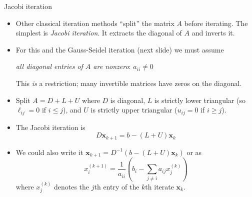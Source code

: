 \documentclass[10pt,hyperref]{beamer}
\newcommand{\bx}{\mathbf{x}}
\begin{document}
\begin{frame}{Jacobi iteration}

\begin{itemize}
\item Other classical iteration methods ``split'' the matrix $A$ before iterating.  The simplest is \emph{Jacobi iteration}.  It extracts the diagonal of $A$ and inverts it.
\item For this and the Gauss-Seidel iteration (next slide) we must assume

\centerline{\emph{all diagonal entries of $A$ are nonzero}: \quad  $a_{ii} \ne 0$}

\noindent This \emph{is} a restriction; many invertible matrices have zeros on the diagonal.

\item Split $A = D + L + U$ where $D$ is diagonal, $L$ is strictly lower triangular (so $\ell_{ij} = 0$ if $i \le j$), and $U$ is strictly upper triangular ($u_{ij} = 0$ if $i \ge j$).
\item The Jacobi iteration is
\begin{equation}
D \bx_{k+1} = b - (L + U) \bx_k  \label{jacobi}
\end{equation}
\item We could also write it \quad $\bx_{k+1} = D^{-1} \left(b - (L + U) \bx_k\right)$ \quad or as
\begin{equation*}
x_i^{(k+1)} = \frac{1}{a_{ii}} \left(b_i - \sum_{j\ne i} a_{ij} x_j^{(k)}\right)
\end{equation*}
where $x_j^{(k)}$ denotes the $j$th entry of the $k$th iterate $\bx_k$.
\end{itemize}
\end{frame}
\end{document}
